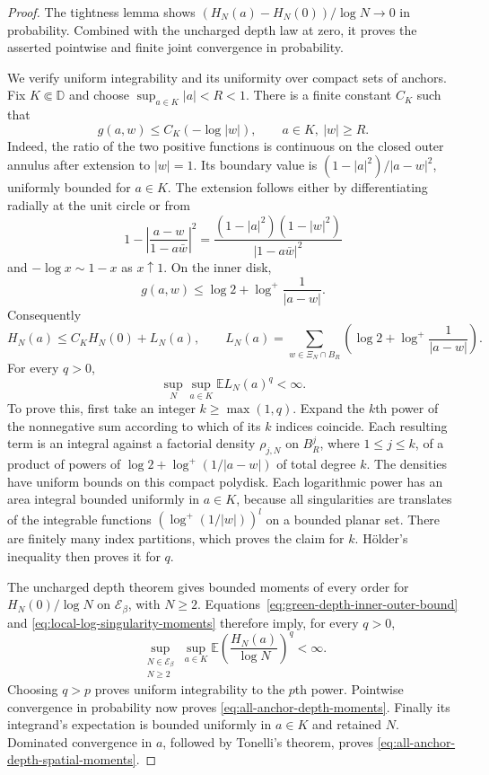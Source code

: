 \documentclass[11pt,a4paper]{article}
\numberwithin{equation}{section}
\theoremstyle{definition}
\theoremstyle{remark}
\newcommand{\D}{\mathbb D}
\newcommand{\N}{\mathbb N}
\begin{document}
\begin{proof}
The tightness lemma shows
$(H_N(a)-H_N(0))/\log N\to0$ in probability.  Combined with the
uncharged depth law at zero, it proves the asserted pointwise and finite
joint convergence in probability.

We verify uniform integrability and its uniformity over compact sets of
anchors.  Fix $K\Subset\D$ and choose
$\sup_{a\in K}|a|<R<1$.  There is a finite constant $C_K$ such that
\begin{equation}
 g(a,w)\le C_K(-\log|w|),\qquad a\in K,\ |w|\ge R.
 \label{eq:green-depth-outer-comparison}
\end{equation}
Indeed, the ratio of the two positive functions is continuous on the
closed outer annulus after extension to $|w|=1$.  Its boundary value is
$(1-|a|^2)/|a-w|^2$, uniformly bounded for $a\in K$.  The extension
follows either by differentiating radially at the unit circle or from
\[
 1-\left|\frac{a-w}{1-a\bar w}\right|^2
       =\frac{(1-|a|^2)(1-|w|^2)}{|1-a\bar w|^2}
\]
and $-\log x\sim1-x$ as $x\uparrow1$.
On the inner disk,
\[
 g(a,w)\le\log2+\log^+\frac1{|a-w|}.
\]
Consequently
\begin{equation}
 H_N(a)\le C_K H_N(0)+L_N(a),\qquad
 L_N(a)=\sum_{w\in\Xi_N\cap B_R}
       \left(\log2+\log^+\frac1{|a-w|}\right).
 \label{eq:green-depth-inner-outer-bound}
\end{equation}
For every $q>0$,
\begin{equation}
 \sup_N\sup_{a\in K}\mathbb E L_N(a)^q<\infty.
 \label{eq:local-log-singularity-moments}
\end{equation}
To prove this, first take an integer $k\ge\max(1,q)$.  Expand the
$k$th power of the nonnegative sum according to which of its $k$ indices
coincide.  Each resulting term is an integral against a factorial
density $\rho_{j,N}$ on $B_R^j$, where $1\le j\le k$, of a product
of powers of $\log2+\log^+(1/|a-w|)$ of total degree $k$.
The densities have uniform bounds on this compact polydisk.  Each
logarithmic power has an area integral bounded uniformly in $a\in K$,
because all singularities are translates of the integrable functions
$(\log^+(1/|w|))^l$ on a bounded planar set.  There are finitely many
index partitions, which proves the claim for $k$.  H\"older's
inequality then proves it for $q$.

The uncharged depth theorem gives bounded moments of every order for
$H_N(0)/\log N$ on $\mathcal E_\beta$, with $N\ge2$.
Equations~\eqref{eq:green-depth-inner-outer-bound} and
\eqref{eq:local-log-singularity-moments} therefore imply, for every
$q>0$,
\[
 \sup_{\substack{N\in\mathcal E_\beta\\N\ge2}}
 \sup_{a\in K}\mathbb E\left(\frac{H_N(a)}{\log N}\right)^q
 <\infty.
\]
Choosing $q>p$ proves uniform integrability to the $p$th power.
Pointwise convergence in probability now proves
\eqref{eq:all-anchor-depth-moments}.  Finally its integrand's expectation
is bounded uniformly in $a\in K$ and retained $N$.  Dominated convergence
in $a$, followed by Tonelli's theorem, proves
\eqref{eq:all-anchor-depth-spatial-moments}.
\end{proof}
\end{document}
